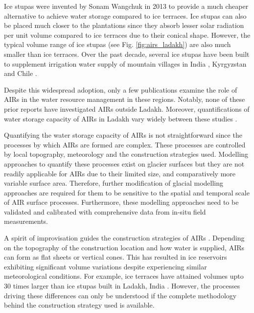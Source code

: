 Ice stupas were invented by Sonam Wangchuk in 2013 \cite{wangchukIceStupaArtificial2014} to provide a much
cheaper alternative to achieve water storage compared to ice terraces. Ice stupas can also be placed much closer
to the plantations since they absorb lesser solar radiation per unit volume compared to ice terraces due to
their conical shape. However, the typical volume range of ice stupas (see Fig. \ref{fig:airs_ladakh}) are also
much smaller than ice terraces. Over the past decade, several ice stupas have been built to supplement
irrigation water supply of mountain villages in India \citep{wangchukIceStupaCompetition2020,
palmerStoringFrozenWater2022, aggarwalAdaptationClimateChange2021}, Kyrgyzstan
\citep{bbcnewsBrightArtificialGlacier2020} and Chile \citep{reutersConservationistsChileAim2021}.

Despite this widespread adoption, only a few publications examine the role of AIRs in the water resource
management in these regions. Notably, none of these prior reports have investigated AIRs outside Ladakh.
Moreover, quantifications of water storage capacity of AIRs in Ladakh vary widely between these studies
\citep{norphelSnowWaterHarvesting2015, baglaArtificialGlaciersHelp1998}.

Quantifying the water storage capacity of AIRs is not straightforward since the processes by which AIRs are
formed are complex. These processes are controlled by local topography, meteorology and the construction
strategies used. Modelling approaches to quantify these processes exist on glacier surfaces but they are not
readily applicable for AIRs due to their limited size, and comparatively more variable surface area. Therefore,
further modification of glacial modelling approaches are required for them to be sensitive to the spatial and
temporal scale of AIR surface processes. Furthermore, these modelling approaches need to be validated and
calibrated with comprehensive data from in-situ field measurements. 

A spirit of improvisation guides the construction strategies of AIRs \cite{clouseLadakhArtificialGlaciers2017}.
Depending on the topography of the construction location and how water is supplied, AIRs can form as flat sheets
or vertical cones. This has resulted in ice reservoirs exhibiting significant volume variations despite
experiencing similar meteorological conditions. For example, ice terraces have attained volumes upto 30 times
larger than ice stupas built in Ladakh, India \cite{nusserSociohydrologyArtificialGlaciers2019}. However, the
processes driving these differences can only be understood if the complete methodology behind the construction
strategy used is available.

